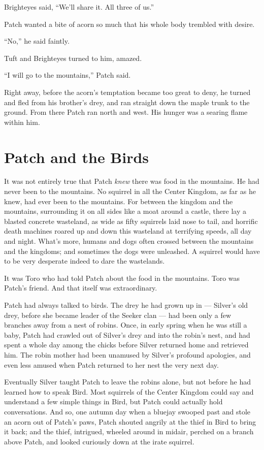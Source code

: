 \documentclass[12pt]{memoir}
\begin{document}
Brighteyes said, “We’ll share it. All three of us.”

Patch wanted a bite of acorn so much that his whole body trembled with
desire.

“No,” he said faintly.

Tuft and Brighteyes turned to him, amazed.

“I will go to the mountains,” Patch said.

Right away, before the acorn’s temptation became too great to deny, he
turned and fled from his brother’s drey, and ran straight down the
maple trunk to the ground. From there Patch ran north and west. His
hunger was a searing flame within him.


\section{Patch and the Birds}

It was not entirely true that Patch \textit{knew} there was food in
the mountains. He had never been to the mountains. No squirrel in all
the Center Kingdom, as far as he knew, had ever been to the
mountains. For between the kingdom and the mountains, surrounding it
on all sides like a moat around a castle, there lay a blasted concrete
wasteland, as wide as fifty squirrels laid nose to tail, and horrific
death machines roared up and down this wasteland at terrifying speeds,
all day and night. What’s more, humans and dogs often crossed between
the mountains and the kingdoms; and sometimes the dogs were
unleashed. A squirrel would have to be very desperate indeed to dare
the wastelands.

It was Toro who had told Patch about the food in the mountains. Toro
was Patch’s friend. And that itself was extraordinary.

Patch had always talked to birds. The drey he had grown up in —
Silver’s old drey, before she became leader of the Seeker clan — had
been only a few branches away from a nest of robins. Once, in early
spring when he was still a baby, Patch had crawled out of Silver’s
drey and into the robin’s nest, and had spent a whole day among the
chicks before Silver returned home and retrieved him. The robin mother
had been unamused by Silver’s profound apologies, and even less amused
when Patch returned to her nest the very next day.

Eventually Silver taught Patch to leave the robins alone, but not
before he had learned how to speak Bird. Most squirrels of the Center
Kingdom could say and understand a few simple things in Bird, but
Patch could actually hold conversations. And so, one autumn day when a
bluejay swooped past and stole an acorn out of Patch’s paws, Patch
shouted angrily at the thief in Bird to bring it back; and the thief,
intrigued, wheeled around in midair, perched on a branch above Patch,
and looked curiously down at the irate squirrel.
\end{document}
